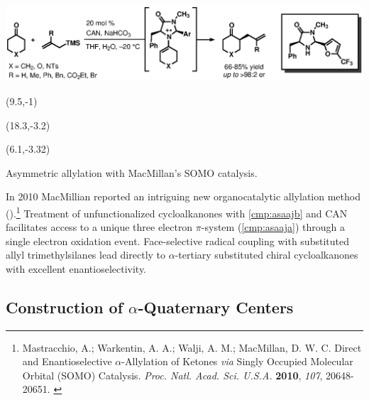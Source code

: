   \begin{Scheme}[h]
  \centering
  \includegraphics[scale=0.8]{chp_asymmetric/images/macmillansomo}
  \begin{textblock}{1}(9.5,-1)  \end{textblock}
  \begin{textblock}{1}(18.3,-3.2)  \end{textblock}
  \begin{textblock}{1}(6.1,-3.32)  \end{textblock}
  \caption{Asymmetric allylation with MacMillan's SOMO catalysis.}
  \label{sch:macmillansomo}
\end{Scheme}   
 In 2010 MacMillian reported an intriguing new organocatalytic allylation
 method ().\footnote{{\frenchspacing Mastracchio, A.; Warkentin, A.
 A.; Walji, A.
 M.; MacMillan, D. W. C. Direct and Enantioselective $\alpha$-Allylation of Ketones \textit{via}
 Singly Occupied Molecular Orbital (SOMO) Catalysis. \textit{Proc. Natl. Acad. Sci. U.S.A.}
 \textbf{2010}, \textit{107}, 20648-20651.} \label{ref:macmillansomo}} Treatment of unfunctionalized
 cycloalkanones with \ref{cmp:asaajb} and CAN facilitates access to a unique three electron
 $\pi$-system (\ref{cmp:asaaja}) through a single electron oxidation event. Face-selective radical
 coupling with substituted allyl trimethylsilanes lead directly to $\alpha$-tertiary substituted
 chiral cycloalkanones with excellent enantioselectivity. 

 
 \subsection{Construction of $\alpha$-Quaternary Centers}
 

